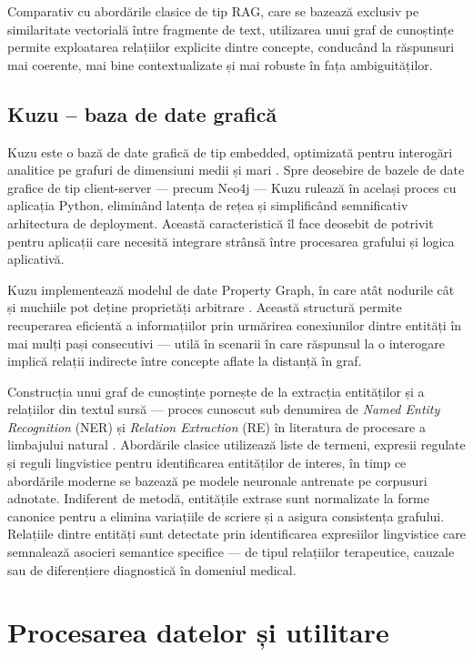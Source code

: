 \documentclass[12pt, a4paper, oneside, romanian]{teza-upb}
\begin{document}
Comparativ cu abordările clasice de tip RAG, care se bazează exclusiv pe similaritate vectorială între fragmente de text, utilizarea unui graf de cunoștințe permite exploatarea relațiilor explicite dintre concepte, conducând la răspunsuri mai coerente, mai bine contextualizate și mai robuste în fața ambiguităților. \cite{edge2024local}

\subsection{Kuzu -- baza de date grafică}

Kuzu este o bază de date grafică de tip embedded, optimizată pentru interogări analitice pe grafuri de dimensiuni medii și mari \cite{kuzu_doc}. Spre deosebire de bazele de date grafice de tip client-server — precum Neo4j — Kuzu rulează în același proces cu aplicația Python, eliminând latența de rețea și simplificând semnificativ arhitectura de deployment. Această caracteristică îl face deosebit de potrivit pentru aplicații care necesită integrare strânsă între procesarea grafului și logica aplicativă.


Kuzu implementează modelul de date Property Graph, în care atât nodurile cât 
și muchiile pot deține proprietăți arbitrare \cite{kuzu_doc, kuzu:cidr}. 
Această structură permite recuperarea eficientă a informațiilor prin urmărirea 
conexiunilor dintre entități în mai mulți pași consecutivi — utilă în scenarii 
în care răspunsul la o interogare implică relații indirecte între concepte 
aflate la distanță în graf.


Construcția unui graf de cunoștințe pornește de la extracția entităților și a 
relațiilor din textul sursă — proces cunoscut sub denumirea de 
\textit{Named Entity Recognition} (NER) și \textit{Relation Extraction} (RE) 
în literatura de procesare a limbajului natural \cite{jurafsky2023}. Abordările 
clasice utilizează liste de termeni, expresii regulate și reguli lingvistice 
pentru identificarea entităților de interes, în timp ce abordările moderne 
se bazează pe modele neuronale antrenate pe corpusuri adnotate. Indiferent de 
metodă, entitățile extrase sunt normalizate la forme canonice pentru a elimina 
variațiile de scriere și a asigura consistența grafului. Relațiile dintre 
entități sunt detectate prin identificarea expresiilor lingvistice care 
semnalează asocieri semantice specifice — de tipul relațiilor terapeutice, 
cauzale sau de diferențiere diagnostică în domeniul medical.

\section{Procesarea datelor și utilitare}
\end{document}
